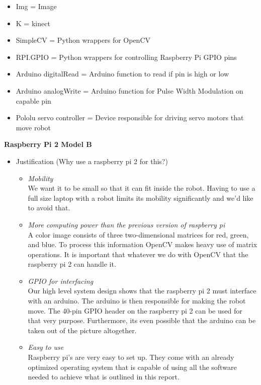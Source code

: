 \documentclass[12pt]{article}
\begin{document}
\begin{description}
\begin{tikzpicture}[thick]
		\end{tikzpicture}
		\begin{itemize}
			\item Img = Image
			\item K = kinect
			\item SimpleCV = Python wrappers for OpenCV
			\item RPI.GPIO = Python wrappers for controlling Raspberry Pi GPIO pins
			\item Arduino digitalRead = Arduino function to read if pin is high or low
			\item Arduino analogWrite = Arduino function for Pulse Width Modulation on capable pin
			\item Pololu servo controller = Device responsible for driving servo motors that move robot
		\end{itemize}
		\newpage
		\textbf{Raspberry Pi 2 Model B}
		\begin{itemize}
			\item Justification (Why use a raspberry pi 2 for this?)
				\begin{itemize}
					\item \textit{Mobility} \\
						We want it to be small so that it can fit inside the robot. Having to use a full size laptop with a robot limits its mobility significantly and we'd like to avoid that.
					\item \textit{More computing power than the previous version of raspberry pi} \\
						A color image consists of three two-dimensional matrices for red, green, and blue. To process this information OpenCV makes heavy use of matrix operations.
						It is important that whatever we do with OpenCV that the raspberry pi 2 can handle it.
					\item \textit{GPIO for interfacing} \\
						Our high level system design shows that the raspberry pi 2 must interface with an arduino. The arduino is then responsible for making the robot move.
						The 40-pin GPIO header on the raspberry pi 2 can be used for that very purpose. Furthermore, its even possible that the arduino can be taken out of the picture altogether.
					\item \textit{Easy to use} \\
						Raspberry pi's are very easy to set up. They come with an already optimized operating system that is capable of using all the software needed to achieve what is outlined in this report.

\end{itemize}
\end{itemize}
\end{description}
\end{document}
